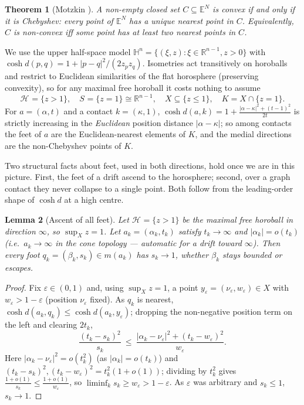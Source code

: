 \documentclass[11pt]{article}
\newtheorem{theorem}{Theorem}[section]
\newtheorem{lemma}[theorem]{Lemma}
\theoremstyle{remark}
\newcommand{\R}{\mathbb{R}}
\newcommand{\X}{X}
\newcommand{\Hb}[1]{\mathcal{H}_{#1}}
\newcommand{\Sb}[1]{S_{#1}}
\begin{document}
\begin{theorem}[Motzkin \cite{Mot}]\label{thm:motzkin}
A non-empty closed set $C\subseteq\mathbb{E}^{N}$ is convex if and only
if it is \emph{Chebyshev}: every point of $\mathbb{E}^{N}$ has a unique
nearest point in $C$. Equivalently, $C$ is non-convex iff some point
has at least two nearest points in $C$.
\end{theorem}

We use the upper half-space model
$\mathbb{H}^{n}=\{(\xi,z):\xi\in\R^{n-1},z>0\}$ with
$\cosh d(p,q)=1+\lvert p-q\rvert^{2}/(2z_{p}z_{q})$. Isometries act
transitively on horoballs and restrict to Euclidean similarities of
the flat horosphere (preserving convexity), so for any maximal free
horoball it costs nothing to assume
\[
\Hb{}=\{z>1\},\quad \Sb{}=\{z=1\}\cong\R^{n-1},\quad
\X\subseteq\{z\le1\},\quad K=\X\cap\{z=1\}.
\]
For $a=(\alpha,t)$ and a contact $k=(\kappa,1)$,
$\cosh d(a,k)=1+\frac{\lvert\alpha-\kappa\rvert^{2}+(t-1)^{2}}{2t}$ is
strictly increasing in the \emph{Euclidean} position distance
$\lvert\alpha-\kappa\rvert$; so among contacts the feet of $a$ are the
Euclidean-nearest elements of $K$, and the medial directions are the
non-Chebyshev points of $K$.

Two structural facts about feet, used in both directions,
hold once we are in this picture. First, the feet of a drift ascend to
the horosphere; second, over a graph contact they never collapse to a
single point. Both follow from the leading-order shape of $\cosh d$ at a
high centre.

\begin{lemma}[Ascent of all feet]\label{lem:ascent2}
Let $\Hb{}=\{z>1\}$ be the maximal free horoball in direction
$\infty$, so $\sup_{\X}z=1$. Let $a_{k}=(\alpha_{k},t_{k})$ satisfy
$t_{k}\to\infty$ and $\lvert\alpha_{k}\rvert=o(t_{k})$ (i.e.\
$a_{k}\to\infty$ in the cone topology --- automatic for a drift toward
$\infty$). Then every foot $q_{k}=(\beta_{k},s_{k})\in m(a_{k})$ has
$s_{k}\to1$, whether $\beta_{k}$ stays bounded or escapes.
\end{lemma}

\begin{proof}
Fix $\varepsilon\in(0,1)$ and, using $\sup_{\X}z=1$, a point
$y_{\varepsilon}=(\nu_{\varepsilon},w_{\varepsilon})\in\X$ with
$w_{\varepsilon}>1-\varepsilon$ (position $\nu_{\varepsilon}$ fixed).
As $q_{k}$ is nearest, $\cosh d(a_{k},q_{k})\le\cosh d(a_{k},
y_{\varepsilon})$; dropping the non-negative position term on the left
and clearing $2t_{k}$,
\[
\frac{(t_{k}-s_{k})^{2}}{s_{k}}\ \le\
\frac{\lvert\alpha_{k}-\nu_{\varepsilon}\rvert^{2}+(t_{k}-w_{\varepsilon})
^{2}}{w_{\varepsilon}} .
\]
Here $\lvert\alpha_{k}-\nu_{\varepsilon}\rvert^{2}=o(t_{k}^{2})$
(as $\lvert\alpha_{k}\rvert=o(t_{k})$) and
$(t_{k}-s_{k})^{2},(t_{k}-w_{\varepsilon})^{2}=t_{k}^{2}(1+o(1))$;
dividing by $t_{k}^{2}$ gives $\frac{1+o(1)}{s_{k}}\le\frac{1+o(1)}
{w_{\varepsilon}}$, so $\liminf_{k}s_{k}\ge w_{\varepsilon}>
1-\varepsilon$. As $\varepsilon$ was arbitrary and $s_{k}\le1$,
$s_{k}\to1$.
\end{proof}
\end{document}

